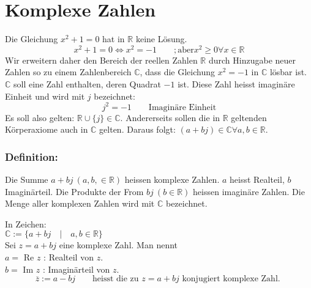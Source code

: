 



\section{Komplexe Zahlen}
Die Gleichung $x^2 + 1 = 0$ hat in $\mathbb{R}$ keine Lösung. 
\[ x^2 + 1 = 0 \Leftrightarrow x^2 = -1 \qquad ; \text{aber} x^2 \geq 0 \forall x \in \mathbb{R} \]
Wir erweitern daher den Bereich der reellen Zahlen $\mathbb{R}$ durch Hinzugabe neuer Zahlen so zu einem Zahlenbereich $\mathbb{C}$, dass die Gleichung $x^2 = -1$ in $\mathbb{C}$ lösbar ist. $\mathbb{C}$ soll eine Zahl enthalten, deren Quadrat $-1$ ist. Diese Zahl heisst imaginäre Einheit und wird mit $j$ bezeichnet: 
\[ \boxed{j^2 = -1} \qquad \text{Imaginäre Einheit} \]
Es soll also gelten: $\mathbb{R} \cup \{j\} \in \mathbb{C}$. 
Andererseits sollen die in $\mathbb{R}$ geltenden Körperaxiome auch in $\mathbb{C}$ gelten. 
Daraus folgt: $(a + b j) \in \mathbb{C} \forall a, b \in \mathbb{R}$. 
\subsubsection{Definition:}
\begin{framed}\noindent
Die Summe $a + b j~(a, b, \in \mathbb{R})$ heissen komplexe Zahlen. $a$ heisst Realteil, $b$ Imaginärteil. Die Produkte der From $b j~(b \in \mathbb{R})$ heissen imaginäre Zahlen. Die Menge aller komplexen Zahlen wird mit $\mathbb{C}$ bezeichnet. 
\end{framed}\noindent
In Zeichen: 
\\$ \mathbb{C}:=\{a + b j \quad | \quad a, b \in \mathbb{R}\} $
\\Sei $z = a + b j$ eine komplexe Zahl. Man nennt
\\$a = $ Re $ z$ : Realteil von $z$. 
\\$b = $ Im $ z$ : Imaginärteil von $z$. 
\[ \boxed{\overline{z} := a - b j} \qquad%
\text{heisst die zu $z = a + b j$ konjugiert komplexe Zahl. } \]

